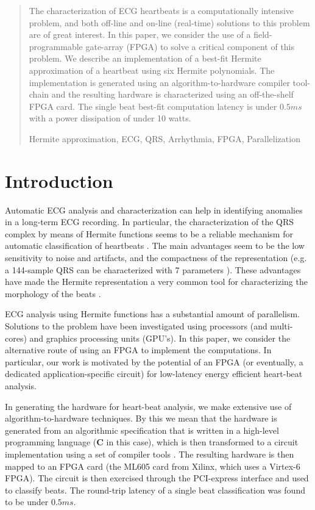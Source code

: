 \documentclass[runningheads]{llncs}
\newcommand{\keywords}[1]{\par\addvspace\baselineskip
\noindent\keywordname\enspace\ignorespaces#1}
\begin{document}
\begin{abstract}
The characterization of ECG heartbeats is a computationally intensive problem, and
both off-line and on-line (real-time) solutions to this problem are of great interest.
In this paper, we consider the use of a field-programmable gate-array (FPGA) to solve
a critical component of this problem. We describe an implementation of
a best-fit Hermite approximation of a heartbeat using six Hermite polynomials.  
The implementation is generated using an algorithm-to-hardware compiler tool-chain
and the resulting hardware is characterized using an off-the-shelf FPGA card.
The single beat best-fit computation latency is under $0.5ms$ with a power dissipation of under 10 watts. 

\keywords{Hermite approximation, ECG, QRS, Arrhythmia,  FPGA, Parallelization}
\end{abstract}


\section{Introduction}

Automatic ECG analysis and characterization can help in 
identifying anomalies in a long-term ECG recording. 
In particular, the characterization of the QRS complex by means of Hermite functions 
seems to be a reliable mechanism  for automatic classification of heartbeats \cite{j:lagerholm00}. 
The main advantages seem to be the low sensitivity to noise and artifacts, and the
compactness of the representation (e.g. a 144-sample QRS can be characterized with 7 parameters \cite{c:marquez13}). 
These advantages have made the Hermite representation a very common tool for characterizing the 
morphology of the beats \cite{j:lagerholm00,c:marquez13,c:braccini97,j:linh03a,j:linh03b}. 

ECG analysis using Hermite functions has a
substantial amount of parallelism.  Solutions to the problem have been investigated
using processors (and multi-cores) and graphics processing units (GPU's). 
In this paper, we consider the alternative route of using an FPGA to implement
the computations.  In particular, our work is motivated by the potential
of an FPGA (or eventually, a dedicated application-specific circuit) for low-latency
energy efficient heart-beat analysis.  

In generating the hardware for heart-beat analysis, we make extensive use of
algorithm-to-hardware techniques.  By this we mean that the hardware is
generated from an algorithmic specification that is written in a
high-level programming language ({\bf C} in this case), which is then
transformed to a circuit implementation using a set of compiler tools \cite{c:ahir_thesis2009,c:ahir_dsd2010,c:ahir_usenix2012}.
The resulting hardware is then mapped to an FPGA card (the ML605 card from Xilinx,
which uses a Virtex-6 FPGA).  The circuit is then exercised through the PCI-express 
interface and used to classify beats.  The round-trip latency of a single
beat classification was found to be under $0.5ms$.
\end{document}
